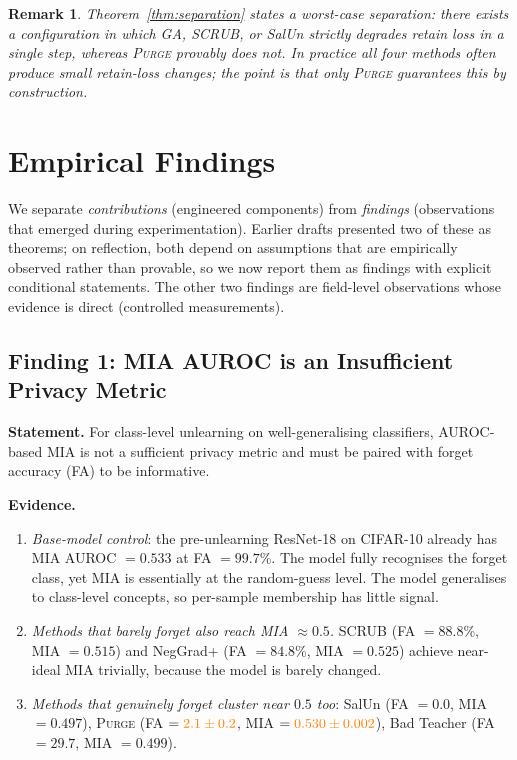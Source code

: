 \documentclass{article}
\newcommand{\ours}{\textsc{Purge}}
\newtheorem{remark}{Remark}
\newcommand{\new}[1]{{\color{orange}#1}}
\begin{document}
\begin{remark}\label{rem:separation_practical}
\new{Theorem~\ref{thm:separation} states a worst-case separation: there exists a configuration in which GA, SCRUB, or SalUn strictly degrades retain loss in a single step, whereas \ours{} provably does not. In practice all four methods often produce small retain-loss changes; the point is that only \ours{} \emph{guarantees} this by construction.}
\end{remark}

\new{
\section{Empirical Findings}\label{sec:findings}

We separate \emph{contributions} (engineered components) from \emph{findings} (observations that emerged during experimentation). Earlier drafts presented two of these as theorems; on reflection, both depend on assumptions that are empirically observed rather than provable, so we now report them as findings with explicit conditional statements. The other two findings are field-level observations whose evidence is direct (controlled measurements).

\subsection{Finding 1: MIA AUROC is an Insufficient Privacy Metric}
\label{find:mia}

\textbf{Statement.} For class-level unlearning on well-generalising classifiers, AUROC-based MIA is not a sufficient privacy metric and must be paired with forget accuracy (FA) to be informative.

\textbf{Evidence.}
\begin{enumerate}[nosep,leftmargin=*]
\item \emph{Base-model control}: the pre-unlearning ResNet-18 on CIFAR-10 already has MIA AUROC $= 0.533$ at FA $= 99.7$\%. The model fully recognises the forget class, yet MIA is essentially at the random-guess level. The model generalises to class-level concepts, so per-sample membership has little signal.
\item \emph{Methods that barely forget also reach MIA $\approx 0.5$.} SCRUB (FA $= 88.8$\%, MIA $= 0.515$) and NegGrad+ (FA $= 84.8$\%, MIA $= 0.525$) achieve near-ideal MIA trivially, because the model is barely changed.
\item \emph{Methods that genuinely forget cluster near $0.5$ too}: SalUn (FA $= 0.0$, MIA $= 0.497$), \ours{} (FA $= \new{2.1 \pm 0.2}$, MIA $= \new{0.530 \pm 0.002}$), Bad Teacher (FA $= 29.7$, MIA $= 0.499$).
\end{enumerate}

}
\end{document}
